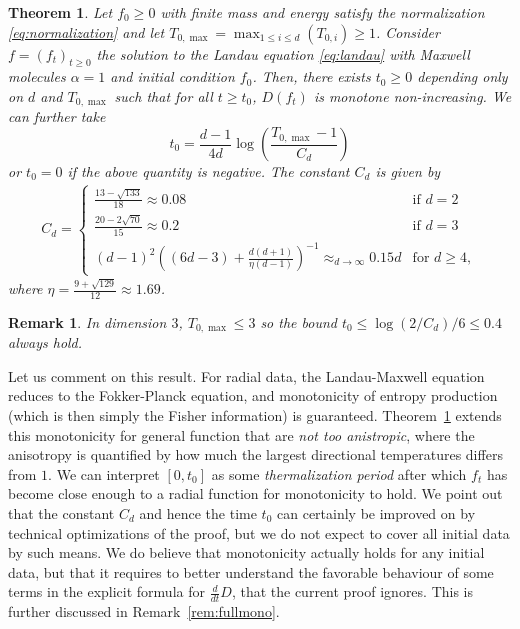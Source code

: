 \documentclass[11pt,a4paper]{article}
\theoremstyle{definition}
\theoremstyle{plain}
\newtheorem{theorem}[defi]{Theorem}
\newtheorem{remark}[defi]{Remark}
\begin{document}
\begin{theorem}
\label{thm:main}
    Let $f_0\geq 0$ with finite mass and energy satisfy the normalization \eqref{eq:normalization}
    and let $T_{0,\max}=\max_{1\leq i \leq d} (T_{0,i})\geq 1$. Consider $f=(f_t)_{t\geq 0}$ the solution to the Landau equation \eqref{eq:landau} with Maxwell molecules $\alpha=1$ and initial condition $f_0$.
    Then, there exists $t_0 \geq 0$ depending only on $d$ and $T_{0,\max}$ such that for all $t\geq t_0$, $D(f_t)$ is monotone non-increasing.
    We can further take 
    $$t_0=\frac{d-1}{4d}\log\left(\frac{T_{0,\max}-1}{C_d}\right)$$
    or $t_0=0$ if the above quantity is negative. The constant $C_d$ is given by
    \begin{align*}
       C_d= \begin{cases}
            \frac{13-\sqrt{133}}{18}\approx 0.08 & \text{if }d=2 \\
            \frac{20-2\sqrt{70}}{15}\approx 0.2 & \text{if }d=3 \\
         (d-1)^2\left((6d-3)+\frac{d(d+1)}{\eta(d-1)}\right)^{-1}\approx_{d\rightarrow \infty} 0.15d & \text{for }d\geq 4,
        \end{cases}
    \end{align*}
    where $\eta=\frac{9+\sqrt{129}}{12}\approx 1.69$.
\end{theorem}
\begin{remark}
    In dimension $3$, $T_{0,\max}\leq 3$ so the bound $t_0\leq \log(2/C_d)/6\leq 0.4$ always hold.
\end{remark}
Let us comment on this result. For radial data, the Landau-Maxwell equation reduces to the Fokker-Planck equation, and monotonicity of entropy production (which is then simply the Fisher information) is guaranteed. Theorem~\ref{thm:main} extends this monotonicity for general function that are \textit{not too anistropic}, where the anisotropy is quantified by how much the largest directional temperatures differs from $1$. We can interpret $[0,t_0]$ as some \textit{thermalization period} after which $f_t$ has become close enough to a radial function for monotonicity to hold. We point out that the constant $C_d$ and hence the time $t_0$ can certainly be improved on by technical optimizations of the proof, but we do not expect to cover all initial data by such means. We do believe that monotonicity actually holds for any initial data, but that it requires to better understand the favorable behaviour of some terms in the explicit formula for $\frac{d}{dt}D$, that the current proof ignores. This is further discussed in Remark~\ref{rem:fullmono}. 
\end{document}
